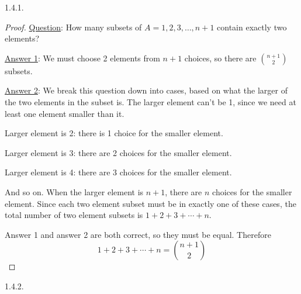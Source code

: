  \protect {} \protect \begin {itemize} 
\begin{ans}{1.4.1.}
	\begin{proof}
        \underline{Question}: How many subsets of $A = {1,2,3, \ldots, n+1}$ contain exactly two elements?

        \underline{Answer 1}: We must choose 2 elements from $n+1$ choices, so there are ${n+1 \choose 2}$ subsets.

        \underline{Answer 2}: We break this question down into cases, based on what the larger of the two elements in the subset is. The larger element can't be 1, since we need at least one element smaller than it.

        Larger element is 2: there is 1 choice for the smaller element.

        Larger element is 3: there are 2 choices for the smaller element.

        Larger element is 4: there are 3 choices for the smaller element.

        And so on.  When the larger element is $n+1$, there are $n$ choices for the smaller element.  Since each two element subset must be in exactly one of these cases, the total number of two element subsets is $1 + 2 + 3 + \cdots + n$.

        Answer 1 and answer 2 are both correct, so they must be equal.  Therefore
        \[1 + 2 + 3 + \cdots + n = {n+1 \choose 2}\]
       \end{proof}
	
\end{ans}
\begin{ans}{1.4.2.}
\end{ans}
\end{itemize}
